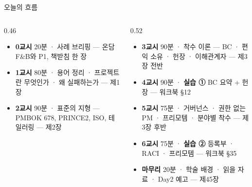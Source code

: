 \begin{frame}{오늘의 흐름}
\begin{columns}[T]
\begin{column}{0.46\textwidth}
\begin{itemize}
\item \textbf{0교시} 20분 · 사례 브리핑 — 온담F\&B와 P1, 책받침 한 장
\item \textbf{1교시} 80분 · 용어 정리 · 프로젝트란 무엇인가 · 왜 실패하는가 — 제1장
\item \textbf{2교시} 90분 · 표준의 지형 — PMBOK 6\ra{}7\ra{}8, PRINCE2, ISO, 테일러링 — 제2장
\end{itemize}
\end{column}
\begin{column}{0.52\textwidth}
\begin{itemize}
\item \textbf{3교시} 90분 · 착수 이론 — BC · 편익 소유 · 헌장 · 이해관계자 — 제3장 전반
\item \textbf{4교시} 90분 · \textbf{실습 ①} BC 요약 + 헌장 — 워크북 §1\til{}2
\item \textbf{5교시} 75분 · 거버넌스 · 권한 없는 PM · 프리모템 · 분야별 착수 — 제3장 후반
\item \textbf{6교시} 75분 · \textbf{실습 ②} 등록부 · RACI · 프리모템 — 워크북 §3\til{}5
\item \textbf{마무리} 20분 · 학술 배경 · 읽을 자료 · Day2 예고 — 제4\til{}5장
\end{itemize}
\end{column}
\end{columns}
\end{frame}

